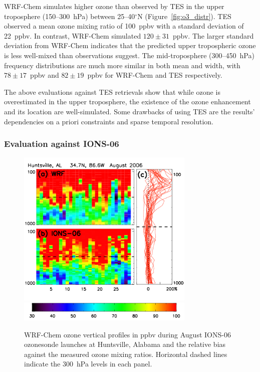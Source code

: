 WRF-Chem simulates higher ozone than observed by
TES in the upper troposphere (150--300~hPa) between 25--40$^\circ$N (Figure~\ref{fig:o3_distr}). TES observed a mean ozone
mixing ratio of 100~ppbv with a standard deviation of 22~ppbv. In contrast, WRF-Chem
simulated $120\pm31$~ppbv. The larger standard deviation from WRF-Chem indicates that
the predicted upper tropospheric ozone is less well-mixed than observations suggest.
The mid-troposphere (300--450~hPa) frequency distributions are much more similar in both mean
and width, with $78\pm17$~ppbv and $82\pm19$~ppbv for WRF-Chem and TES
respectively.

The above evaluations against TES retrievals show that while ozone is overestimated in the upper
troposphere, the existence of the ozone enhancement and its location are well-simulated.
Some drawbacks of using TES are the results' dependencies on a priori constraints and sparse
temporal resolution.

\subsubsection{Evaluation against IONS-06}

 \begin{figure}
 \noindent\includegraphics[width=20pc]{figures/o3/ions_huntsville.png} \\
 \noindent\includegraphics[width=20pc]{figures/o3/o3_colorbar.png}
 \caption{WRF-Chem ozone vertical profiles in ppbv during August IONS-06 ozonesonde launches at
Huntsville, Alabama and the relative bias against the measured ozone mixing ratios. Horizontal
dashed lines indicate the 300~hPa levels in each panel.}
 \label{fig:huntsville}
 \end{figure}

